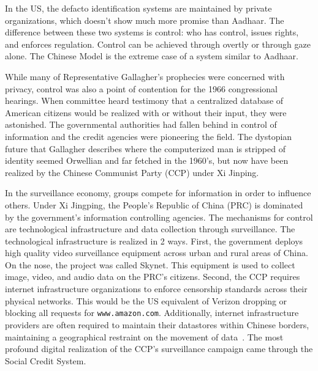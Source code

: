 In the US, the defacto identification systems are maintained by private
organizations, which doesn't show much more promise than Aadhaar. The
difference between these two systems is control: who has control, issues
rights, and enforces regulation. Control can be achieved through overtly or
through gaze alone. The Chinese Model is the extreme case of a system similar
to Aadhaar.

While many of Representative Gallagher's prophecies were concerned with
privacy, control was also a point of contention for the 1966 congressional
hearings. When committee heard testimony that a centralized database of
American citizens would be realized with or without their input, they were
astonished. The governmental authorities had fallen behind in control of
information and the credit agencies were pioneering the field. The dystopian
future that Gallagher describes where the computerized man is stripped of
identity seemed Orwellian and far fetched in the 1960's, but now have been
realized by the Chinese Communist Party (CCP) under Xi Jinping.

In the surveillance economy, groups compete for information in order to
influence others. Under Xi Jingping, the People's Republic of China (PRC) is
dominated by the government's information controlling agencies. The mechanisms
for control are technological infrastructure and data collection through
surveillance. The technological infrastructure is realized in 2 ways. First,
the government deploys high quality video surveillance equipment across urban
and rural areas of China. On the nose, the project was called Skynet. This
equipment is used to collect image, video, and audio data on the PRC's
citizens. Second, the CCP requires internet infrastructure organizations to
enforce censorship standards across their physical networks. This would be the
US equivalent of Verizon dropping or blocking all requests for
\texttt{www.amazon.com}. Additionally, internet infrastructure providers are
often required to maintain their datastores within Chinese borders, maintaining
a geographical restraint on the movement of data~\cite{qiang2019road}. The most
profound digital realization of the CCP's surveillance campaign came through
the Social Credit System.

